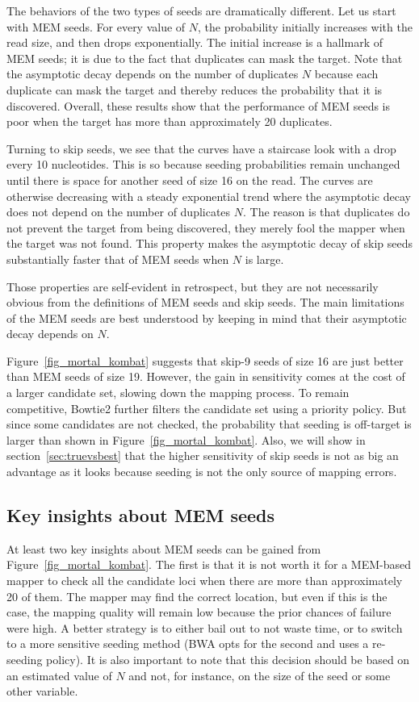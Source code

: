 \documentclass{article}
\begin{document}
The behaviors of the two types of seeds are dramatically different. Let us
start with MEM seeds. For every value of $N$, the probability initially
increases with the read size, and then drops exponentially. The initial
increase is a hallmark of MEM seeds; it is due to the fact that duplicates
can mask the target. Note that the asymptotic decay depends on the number
of duplicates $N$ because each duplicate can mask the target and thereby
reduces the probability that it is discovered. Overall, these results show
that the performance of MEM seeds is poor when the target has more than
approximately 20 duplicates.

Turning to skip seeds, we see that the curves have a staircase look with a
drop every 10 nucleotides. This is so because seeding probabilities remain
unchanged until there is space for another seed of size 16 on the read.
The curves are otherwise decreasing with a steady exponential trend where
the asymptotic decay does not depend on the number of duplicates $N$. The
reason is that duplicates do not prevent the target from being discovered,
they merely fool the mapper when the target was not found. This property
makes the asymptotic decay of skip seeds substantially faster that of MEM
seeds when $N$ is large.

Those properties are self-evident in retrospect, but they are not
necessarily obvious from the definitions of MEM seeds and skip seeds.
The main limitations of the MEM seeds are best understood by keeping in
mind that their asymptotic decay depends on $N$.

Figure~\ref{fig_mortal_kombat} suggests that skip-9 seeds of size 16 are
just better than MEM seeds of size 19. However, the gain in sensitivity
comes at the cost of a larger candidate set, slowing down the mapping
process. To remain competitive, Bowtie2 further filters the candidate set
using a priority policy. But since some candidates are not checked, the
probability that seeding is off-target is larger than shown in
Figure~\ref{fig_mortal_kombat}. Also, we will show in
section~\ref{sec:truevsbest} that the higher sensitivity of skip seeds is
not as big an advantage as it looks because seeding is not the only source
of mapping errors.

\subsection{Key insights about MEM seeds}

At least two key insights about MEM seeds can be gained from
Figure~\ref{fig_mortal_kombat}. The first is that it is not worth it for a
MEM-based mapper to check all the candidate loci when there are more than
approximately 20 of them. The mapper may find the correct location, but
even if this is the case, the mapping quality will remain low because the
prior chances of failure were high. A better strategy is to either bail
out to not waste time, or to switch to a more sensitive seeding method
(BWA opts for the second and uses a re-seeding policy). It is also
important to note that this decision should be based on an estimated value
of $N$ and not, for instance, on the size of the seed or some other
variable.
\end{document}
